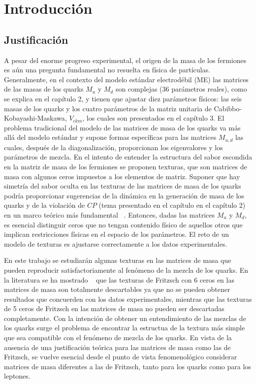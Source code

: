 \chapter{Introducci\'on}

\section{Justificaci\'on}
A pesar del enorme progreso experimental, el origen de la masa de los
fermiones es a\'un una pregunta fundamental no resuelta en f\'isica de 
part\'iculas. Generalmente, en el contexto del modelo est\'andar electrod\'ebil
(ME) las matrices de las masas de los quarks $M_u$ y $M_d$ son complejas (36 
par\'ametros reales), como se explica en el cap\'itulo 2, y tienen que ajustar 
diez par\'ametros f\'isicos: las seis masas de los quarks y los cuatro 
par\'ametros de la matriz unitaria de Cabibbo-Kobayashi-Maskawa, $V_{ckm}$, los
cuales son presentados en el cap\'itulo 3. El problema  tradicional del modelo 
de las matrices de masa de los quarks va m\'as all\'a del modelo est\'andar y
supone formas espec\'ificas para las matrices $M_{u,d}$ las cuales, despu\'es de
la diagonalizaci\'on, proporcionan los eigenvalores y los par\'ametros de 
mezcla. En el intento de entender la estructura del sabor escondida en la matriz
de masa de los fermiones se proponen texturas, que son matrices de masa con
algunos ceros impuestos a los elementos de matriz. Suponer que hay simetr\'ia
del sabor oculta en las texturas de las matrices de masa de los quarks podr\'ia
proporcionar sugerencias de la din\'amica en la generaci\'on de masa de los
quarks y de la violaci\'on de $CP$ (tema presentado en el cap\'itulo en el
cap\'itulo 2) en un marco te\'orico m\'as fundamental ~\cite{Fri200001}.
 Entonces, dadas las matrices $M_u$ y $M_d$, es esencial
distinguir ceros que no tengan contenido f\'isico de aquellos otros que implican
restricciones f\'isicas en el espacio de los par\'ametros. El reto de un modelo
de texturas es ajustarse correctamente a los datos experimentales.

En este trabajo se estudiar\'an algunas texturas en las matrices de masa que 
pueden reproducir satisfactoriamente al fen\'omeno de la mezcla de los quarks. 
En la literatura se ha mostrado ~\cite{Mah200901} que las texturas de Fritzsch 
con 6 ceros en las matrices de masa son totalmente descartables ya que no se
pueden obtener resultados que concuerden con los datos experimentales, mientras
que las texturas de 5 ceros de Fritzsch en las matrices de masa no pueden ser 
descartadas completamente. Con la intenci\'on de obtener un entendimiento de las
mezclas de los quarks surge el problema de encontrar la estructua de la textura 
m\'as simple que sea compatible con el fen\'omeno de mezcla de los quarks. En 
vista de la ausencia de una justificaci\'on te\'orica para las matrices de masa 
como las de Fritzsch, se vuelve esencial desde el punto de vista 
fenomenol\'ogico considerar matrices de masa diferentes a las de Fritzsch, tanto
para los quarks como para los leptones.

